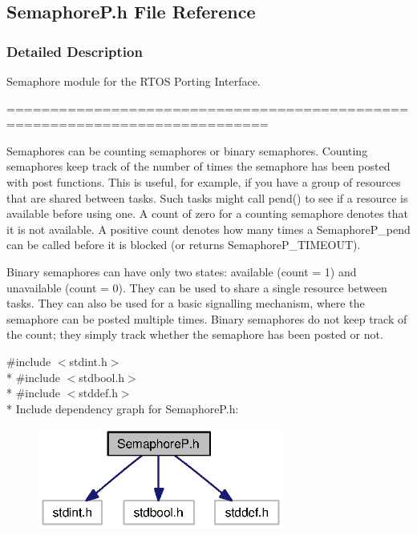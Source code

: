 \subsection{Semaphore\+P.\+h File Reference}
\label{_semaphore_p_8h}


\subsubsection{Detailed Description}
Semaphore module for the R\+T\+O\+S Porting Interface. 

============================================================================

Semaphores can be counting semaphores or binary semaphores. Counting semaphores keep track of the number of times the semaphore has been posted with post functions. This is useful, for example, if you have a group of resources that are shared between tasks. Such tasks might call pend() to see if a resource is available before using one. A count of zero for a counting semaphore denotes that it is not available. A positive count denotes how many times a Semaphore\+P\+\_\+pend can be called before it is blocked (or returns Semaphore\+P\+\_\+\+T\+I\+M\+E\+O\+U\+T).

Binary semaphores can have only two states\+: available (count = 1) and unavailable (count = 0). They can be used to share a single resource between tasks. They can also be used for a basic signalling mechanism, where the semaphore can be posted multiple times. Binary semaphores do not keep track of the count; they simply track whether the semaphore has been posted or not. 

{\ttfamily \#include $<$stdint.\+h$>$}\\*
{\ttfamily \#include $<$stdbool.\+h$>$}\\*
{\ttfamily \#include $<$stddef.\+h$>$}\\*
Include dependency graph for Semaphore\+P.\+h\+:
\nopagebreak
\begin{figure}[H]
\begin{center}
\leavevmode
\includegraphics[width=229pt]{_semaphore_p_8h__incl}
\end{center}
\end{figure}
